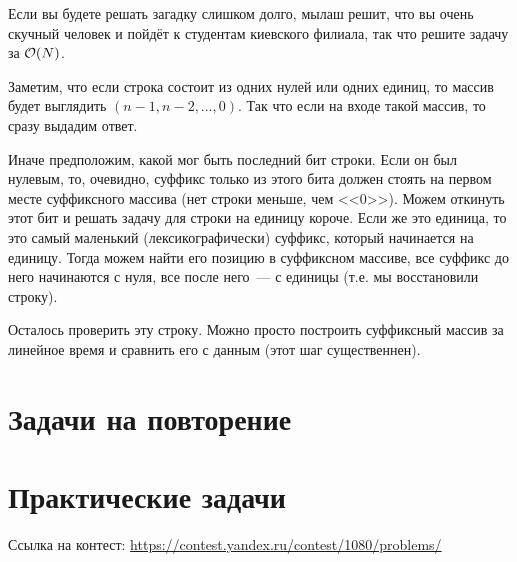 \documentclass[addpoints]{exam}
\begin{document}
\begin{questions}
Если вы будете решать загадку слишком долго, мылаш решит, что вы очень скучный человек и пойдёт к студентам киевского филиала, так что решите задачу за $\mathcal{O}(N)$.

\begin{solution}

Заметим, что если строка состоит из одних нулей или одних единиц, то массив будет выглядить $(n-1, n-2, \ldots, 0)$. Так что если на входе такой массив, то сразу выдадим ответ.

Иначе предположим, какой мог быть последний бит строки. Если он был нулевым, то, очевидно, суффикс только из этого бита должен стоять на первом месте суффиксного массива (нет строки меньше, чем <<0>>). Можем откинуть этот бит и решать задачу для строки на единицу короче. Если же это единица, то это самый маленький (лексикографически) суффикс, который начинается на единицу. Тогда можем найти его позицию в суффиксном массиве, все суффикс до него начинаются с нуля, все после него~--- с единицы (т.е. мы восстановили строку).

Осталось проверить эту строку. Можно просто построить суффиксный массив за линейное время и сравнить его с данным (этот шаг существеннен).

\end{solution}

\section{Задачи на повторение}

\section{Практические задачи}

Ссылка на контест: \url{https://contest.yandex.ru/contest/1080/problems/}

 
\begin{center}
\pointtable[h][questions]
\end{center}

\end{questions}
\end{document}
